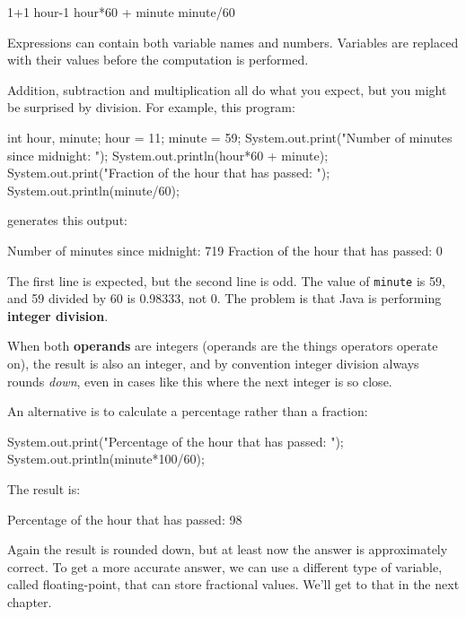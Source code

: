 \begin{code}
1+1        hour-1       hour*60 + minute     minute/60
\end{code}
%
Expressions can contain both variable
names and numbers.  Variables are
replaced with their values before the computation is performed.


Addition, subtraction and multiplication all do what you
expect, but you might be surprised by division.  For example,
this program:

\begin{code}
    int hour, minute;
    hour = 11;
    minute = 59;
    System.out.print("Number of minutes since midnight: ");
    System.out.println(hour*60 + minute);
    System.out.print("Fraction of the hour that has passed: ");
    System.out.println(minute/60);
\end{code}
%
generates this output:

\begin{stdout}
Number of minutes since midnight: 719
Fraction of the hour that has passed: 0
\end{stdout}
%
The first line is expected, but the second line is
odd.  The value of {\tt minute} is 59, and
59 divided by 60 is 0.98333, not 0.  The problem is that
Java is performing {\bf integer division}.


When both {\bf operands} are integers (operands are the things
operators operate on), the result is also an integer,
and by convention integer division always rounds {\em down},
even in cases like this where the next integer is so close.

An alternative is to calculate a percentage
rather than a fraction:

\begin{code}
    System.out.print("Percentage of the hour that has passed: ");
    System.out.println(minute*100/60);
\end{code}
%
The result is:

\begin{stdout}
Percentage of the hour that has passed: 98
\end{stdout}
%
Again the result is rounded down, but at least now the answer
is approximately correct.  To get a more accurate
answer, we can use a different type of variable, called
floating-point, that can store fractional values.
We'll get to that in the next chapter.


